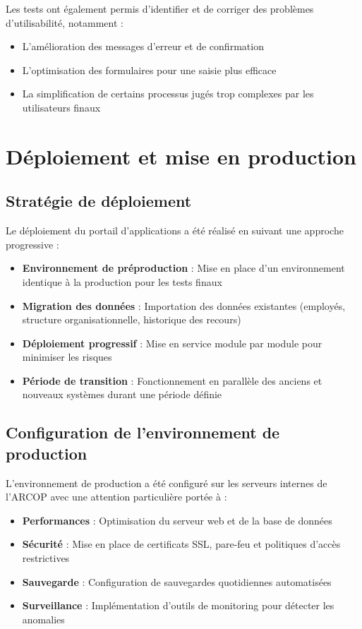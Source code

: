 Les tests ont également permis d'identifier et de corriger des problèmes d'utilisabilité, notamment :

\begin{itemize}
    \item L'amélioration des messages d'erreur et de confirmation
    \item L'optimisation des formulaires pour une saisie plus efficace
    \item La simplification de certains processus jugés trop complexes par les utilisateurs finaux
\end{itemize}
\section{Déploiement et mise en production}

\subsection{Stratégie de déploiement}
Le déploiement du portail d'applications a été réalisé en suivant une approche progressive :

\begin{itemize}
    \item \textbf{Environnement de préproduction} : Mise en place d'un environnement identique à la production pour les tests finaux
    \item \textbf{Migration des données} : Importation des données existantes (employés, structure organisationnelle, historique des recours)
    \item \textbf{Déploiement progressif} : Mise en service module par module pour minimiser les risques
    \item \textbf{Période de transition} : Fonctionnement en parallèle des anciens et nouveaux systèmes durant une période définie
\end{itemize}

\subsection{Configuration de l'environnement de production}
L'environnement de production a été configuré sur les serveurs internes de l'ARCOP avec une attention particulière portée à :

\begin{itemize}
    \item \textbf{Performances} : Optimisation du serveur web et de la base de données
    \item \textbf{Sécurité} : Mise en place de certificats SSL, pare-feu et politiques d'accès restrictives
    \item \textbf{Sauvegarde} : Configuration de sauvegardes quotidiennes automatisées
    \item \textbf{Surveillance} : Implémentation d'outils de monitoring pour détecter les anomalies
\end{itemize}

